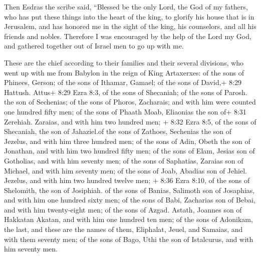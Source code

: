  Then Esdras the scribe said, ``Blessed be the only Lord,
the God of my fathers, who has put these things into the heart of the
king, to glorify his house that is in Jerusalem,  and has
honored me in the sight of the king, his counselors, and all his friends
and nobles.  Therefore I was encouraged by the help of the
Lord my God, and gathered together out of Israel men to go up with me.

 These are the chief according to their families and their
several divisions, who went up with me from Babylon in the reign of King
Artaxerxes:  of the sons of Phinees, Gerson; of the sons of
Ithamar, Gamael; of the sons of David,+ 8:29 Hattush. Attus+ 8:29 Ezra
8:3, of the sons of Shecaniah; of the sons of Parosh. the son of
Sechenias;  of the sons of Phoros, Zacharais; and with him
were counted one hundred fifty men;  of the sons of Phaath
Moab, Eliaonias the son of+ 8:31 Zerehiah. Zaraias, and with him two
hundred men;  + 8:32 Ezra 8:5, of the sons of Shecaniah,
the son of Jahaziel.of the sons of Zathoes, Sechenias the son of
Jezelus, and with him three hundred men; of the sons of Adin, Obeth the
son of Jonathan, and with him two hundred fifty men;  of
the sons of Elam, Jesias son of Gotholias, and with him seventy men;
 of the sons of Saphatias, Zaraias son of Michael, and with
him seventy men;  of the sons of Joab, Abadias son of
Jehiel. Jezelus, and with him two hundred twelve men;  +
8:36 Ezra 8:10, of the sons of Shelomith, the son of Josiphiah. of the
sons of Banias, Salimoth son of Josaphias, and with him one hundred
sixty men;  of the sons of Babi, Zacharias son of Bebai,
and with him twenty-eight men;  of the sons of Azgad.
Astath, Joannes son of Hakkatan Akatan, and with him one hundred ten
men;  of the sons of Adonikam, the last, and these are the
names of them, Eliphalat, Jeuel, and Samaias, and with them seventy men;
 of the sons of Bago, Uthi the son of Istalcurus, and with
him seventy men.

